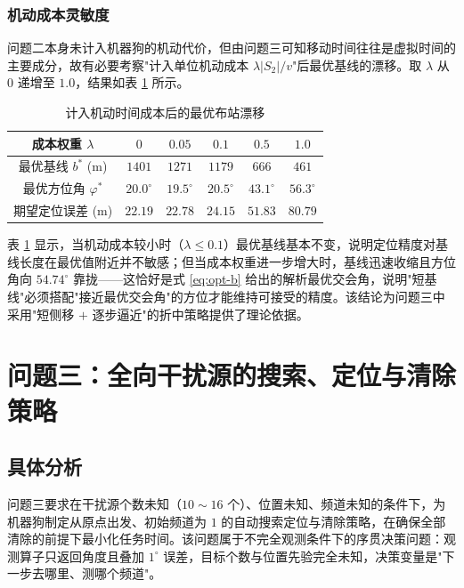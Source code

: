 \documentclass[12pt,a4paper]{ctexart}
\begin{document}
\subsubsection{机动成本灵敏度}

问题二本身未计入机器狗的机动代价，但由问题三可知移动时间往往是虚拟时间的主要成分，故有必要考察"计入单位机动成本 $\lambda\lvert S_2\rvert/v$"后最优基线的漂移。取 $\lambda$ 从 $0$ 递增至 $1.0$，结果如表 \ref{tab:p2-lam} 所示。

\begin{table}[H]
  \centering
  \caption{计入机动时间成本后的最优布站漂移}
  \label{tab:p2-lam}
  \begin{tabular}{cccccc}
    \toprule
    成本权重 $\lambda$ & $0$ & $0.05$ & $0.1$ & $0.5$ & $1.0$ \\
    \midrule
    最优基线 $b^*$ (m) & $1401$ & $1271$ & $1179$ & $666$ & $461$ \\
    最优方位角 $\varphi^*$ & $20.0^\circ$ & $19.5^\circ$ & $20.5^\circ$ & $43.1^\circ$ & $56.3^\circ$ \\
    期望定位误差 (m) & $22.19$ & $22.78$ & $24.15$ & $51.83$ & $80.79$ \\
    \bottomrule
  \end{tabular}
\end{table}

表 \ref{tab:p2-lam} 显示，当机动成本较小时（$\lambda\le0.1$）最优基线基本不变，说明定位精度对基线长度在最优值附近并不敏感；但当成本权重进一步增大时，基线迅速收缩且方位角向 $54.74^\circ$ 靠拢——这恰好是式 \eqref{eq:opt-b} 给出的解析最优交会角，说明"短基线"必须搭配"接近最优交会角"的方位才能维持可接受的精度。该结论为问题三中采用"短侧移 $+$ 逐步逼近"的折中策略提供了理论依据。

\section{问题三：全向干扰源的搜索、定位与清除策略}

\subsection{具体分析}

问题三要求在干扰源个数未知（$10\sim16$ 个）、位置未知、频道未知的条件下，为机器狗制定从原点出发、初始频道为 $1$ 的自动搜索定位与清除策略，在确保全部清除的前提下最小化任务时间。该问题属于不完全观测条件下的序贯决策问题：观测算子只返回角度且叠加 $1^\circ$ 误差，目标个数与位置先验完全未知，决策变量是"下一步去哪里、测哪个频道"。
\end{document}

